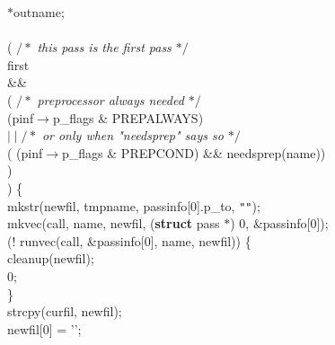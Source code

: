\begin{flushleft}
\hspace*{3\indentation}{\bf char} $\ast$outname;\mbox{}\\
\mbox{}\\
\hspace*{3\indentation}{\bf if} ( {$/\ast$\it{} this pass is the first pass $\ast/$}\mbox{}\\
\hspace*{8\indentation}first\mbox{}\\
\hspace*{6\indentation}\&\&\mbox{}\\
\hspace*{8\indentation}( {$/\ast$\it{} preprocessor always needed $\ast/$}\mbox{}\\
\hspace*{10\indentation}(pinf$\rightarrow$p\_flags \& PREPALWAYS)\mbox{}\\
\hspace*{8\indentation}$\mid\mid${$/\ast$\it{} or only when "needsprep" says so $\ast/$}\mbox{}\\
\hspace*{10\indentation}( (pinf$\rightarrow$p\_flags \& PREPCOND) \&\& needsprep(name))\mbox{}\\
\hspace*{8\indentation})\mbox{}\\
\hspace*{6\indentation}) \{\mbox{}\\
\hspace*{6\indentation}mkstr(newfil, tmpname, passinfo[0].p\_to, {\tt""});\mbox{}\\
\hspace*{6\indentation}mkvec(call, name, newfil, ({\bf struct} pass $\ast$) 0, \&passinfo[0]);\mbox{}\\
\hspace*{6\indentation}{\bf if} (! runvec(call, \&passinfo[0], name, newfil)) \{\mbox{}\\
\hspace*{9\indentation}cleanup(newfil);\mbox{}\\
\hspace*{9\indentation}{\bf return} 0;\mbox{}\\
\hspace*{6\indentation}\}\mbox{}\\
\hspace*{6\indentation}strcpy(curfil, newfil);\mbox{}\\
\hspace*{6\indentation}newfil[0] = '\0';\mbox{}\\

\end{flushleft}
